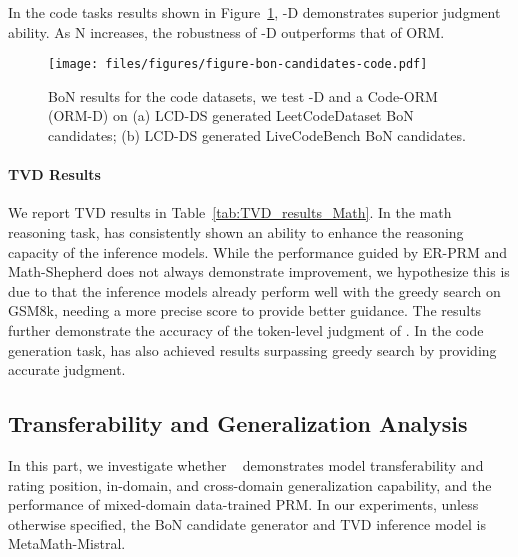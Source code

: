 In the code tasks results shown in Figure~\ref{fig:bon_code_main}, \MethodName-D \hspace{1pt} demonstrates superior judgment ability. As N increases, the robustness of \MethodName-D outperforms that of ORM.




\begin{figure}[htbp]
    \centering

        \texttt{[image: files/figures/figure-bon-candidates-code.pdf]}

    \caption{BoN results for the code datasets, we test \MethodName-D \hspace{1pt} and a Code-ORM (ORM-D) on (a) LCD-DS generated LeetCodeDataset BoN candidates; (b) LCD-DS generated LiveCodeBench BoN candidates.}
    \label{fig:bon_code_main}
\end{figure}


\paragraph{TVD Results}

We report TVD results in Table~\ref{tab:TVD_results_Math}. In the math reasoning task, \MethodName \hspace{1pt} has consistently shown an ability to enhance the reasoning capacity of the inference models. While 
the performance guided by ER-PRM and Math-Shepherd does not always demonstrate improvement, we hypothesize this is due to that the inference models already perform well with the greedy search on GSM8k, needing a more precise score to provide better guidance. The results further demonstrate the accuracy of the token-level judgment of \MethodName. In the code generation task, \MethodName \hspace{1pt} has also achieved results surpassing greedy search by providing accurate judgment. 

\subsection{Transferability and Generalization Analysis}
\label{sec:transfer_gene}

In this part, we investigate whether \MethodName~\hspace{1pt} demonstrates model transferability and rating position, in-domain, and cross-domain generalization capability, and the performance of mixed-domain data-trained PRM. In our experiments, unless otherwise specified, the BoN candidate generator and TVD inference model is MetaMath-Mistral.


